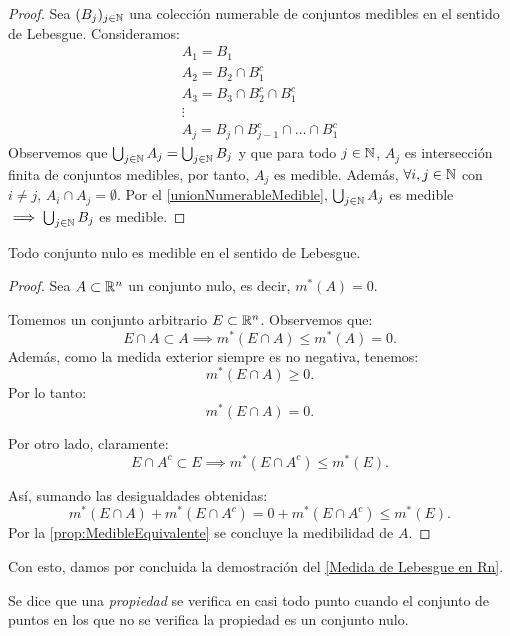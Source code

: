\begin{proof}
    Sea $(B_j)_{j \in \mathbb{N}}$ una colección numerable de conjuntos medibles en el sentido de Lebesgue. Consideramos:
    \[\begin{matrix}
            A_1 = B_1                       \\
            A_2 = B_2 \cap B_1^c            \\
            A_3 = B_3 \cap B_2^c \cap B_1^c \\
            \vdots                          \\
            A_j = B_j \cap B_{j-1}^c \cap \ldots \cap B_1^c
        \end{matrix}\]
    Observemos que $\bigcup_{j \in \mathbb{N}} A_j = \bigcup_{j \in \mathbb{N}} B_j$ y que para
    todo $j \in \mathbb{N}$, $A_j$ es intersección finita de conjuntos medibles, por tanto,
    $A_j$ es medible. Además, $\forall i,j \in \mathbb{N}$ con $i \neq j$, $A_i \cap A_j =
        \emptyset$. Por el \cref{unionNumerableMedible}, $\bigcup_{j \in \mathbb{N}} A_j$ es
    medible $\implies \bigcup_{j \in \mathbb{N}} B_j$ es medible.
\end{proof}

\begin{proposición}
    Todo conjunto nulo es medible en el sentido de Lebesgue.
\end{proposición}

\begin{proof}
    Sea $A \subset \mathbb{R}^n$ un conjunto nulo, es decir, $m^*(A) = 0$.

    Tomemos un conjunto arbitrario $E \subset \mathbb{R}^n$. Observemos que:
    \[
        E \cap A \subset A \implies m^*(E \cap A) \leq m^*(A) = 0.
    \]
    Además, como la medida exterior siempre es no negativa, tenemos:
    \[
        m^*(E \cap A) \geq 0.
    \]
    Por lo tanto:
    \[
        m^*(E \cap A) = 0.
    \]

    Por otro lado, claramente:
    \[
        E \cap A^c \subset E \implies m^*(E \cap A^c) \leq m^*(E).
    \]

    Así, sumando las desigualdades obtenidas:
    \[
        m^*(E \cap A) + m^*(E \cap A^c) = 0 + m^*(E \cap A^c) \leq m^*(E).
    \]
    Por la \cref{prop:MedibleEquivalente} se concluye la medibilidad de $A$.
\end{proof}

Con esto, damos por concluida la demostración del \cref{Medida de Lebesgue en Rn}.


\begin{definición}
Se dice que una \textit{propiedad} se verifica en casi todo punto cuando el conjunto de puntos en los que no se verifica la propiedad es un conjunto nulo.
\end{definición}

